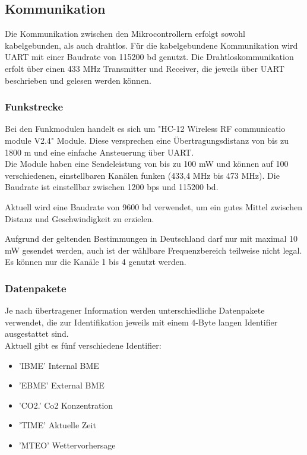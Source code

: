 \documentclass[a4paper,11pt]{article}
\begin{document}
\subsection{Kommunikation}
\label{subsub:kommunikation}

Die Kommunikation zwischen den Mikrocontrollern erfolgt sowohl kabelgebunden, als auch drahtlos. Für die kabelgebundene Kommunikation wird UART mit einer Baudrate
von 115200 bd genutzt. Die Drahtloskommunikation erfolt über einen 433 MHz Transmitter und Receiver, die jeweils über UART beschrieben und gelesen werden können. 

\subsubsection{Funkstrecke}
\label{subsubsub:funkstrecke}

Bei den Funkmodulen handelt es sich um "HC-12 Wireless RF communicatio module V2.4" Module. Diese versprechen eine Übertragungsdistanz von bis zu 1800 m
und eine einfache Ansteuerung über UART. \\
Die Module haben eine Sendeleistung von bis zu 100 mW und können auf 100 verschiedenen, einstellbaren Kanälen funken (433,4 MHz bis 473 MHz). Die Baudrate ist einstellbar
zwischen 1200 bps und 115200 bd.

\vspace{0.2cm}
\noindent
Aktuell wird eine Baudrate von 9600 bd verwendet, um ein gutes Mittel zwischen Distanz und Geschwindigkeit zu erzielen. 

\vspace{0.5cm}
\noindent
Aufgrund der geltenden Bestimmungen in Deutschland darf nur mit maximal 10 mW gesendet werden, auch ist der wählbare Frequenzbereich teilweise nicht legal.
Es können nur die Kanäle 1 bis 4 genutzt werden. 

\subsubsection{Datenpakete}
\label{subsubsub:datenpakete}

Je nach übertragener Information werden unterschiedliche Datenpakete verwendet, die zur Identifikation jeweils mit einem 4-Byte langen Identifier ausgestattet sind. \\
Aktuell gibt es fünf verschiedene Identifier:
\begin{itemize}
  \item 'IBME' Internal BME
  \item 'EBME' External BME
  \item 'CO2.' Co2 Konzentration
  \item 'TIME' Aktuelle Zeit
  \item 'MTEO' Wettervorhersage
\end{itemize}
\end{document}
